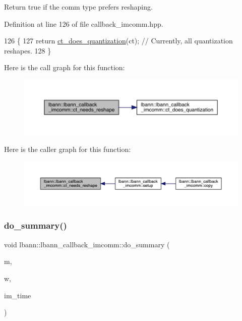 Return true if the comm type prefers reshaping. 

Definition at line 126 of file callback\+\_\+imcomm.\+hpp.


\begin{DoxyCode}
126                                                    \{
127     \textcolor{keywordflow}{return} \hyperlink{classlbann_1_1lbann__callback__imcomm_a8b29853e49c58cf737a741c503737705}{ct\_does\_quantization}(ct);  \textcolor{comment}{// Currently, all quantization reshapes.}
128   \}
\end{DoxyCode}
Here is the call graph for this function\+:\nopagebreak
\begin{figure}[H]
\begin{center}
\leavevmode
\includegraphics[width=350pt]{classlbann_1_1lbann__callback__imcomm_ab7106f5ee53672f5ef5a58371eb39f0b_cgraph}
\end{center}
\end{figure}
Here is the caller graph for this function\+:\nopagebreak
\begin{figure}[H]
\begin{center}
\leavevmode
\includegraphics[width=350pt]{classlbann_1_1lbann__callback__imcomm_ab7106f5ee53672f5ef5a58371eb39f0b_icgraph}
\end{center}
\end{figure}
\mbox{\label{classlbann_1_1lbann__callback__imcomm_ad45c39a7a85fb8e1d99eca97aa4d9d09}} 
\subsubsection{\texorpdfstring{do\+\_\+summary()}{do\_summary()}}
{\footnotesize\ttfamily void lbann\+::lbann\+\_\+callback\+\_\+imcomm\+::do\+\_\+summary (\begin{DoxyParamCaption}\item[{\hyperlink{classlbann_1_1model}{model} $\ast$}]{m,  }\item[{\hyperlink{classlbann_1_1weights}{weights} $\ast$}]{w,  }\item[{\hyperlink{base_8hpp_a3266f5ac18504bbadea983c109566867}{Eval\+Type}}]{im\+\_\+time }\end{DoxyParamCaption})\hspace{0.3cm}{\ttfamily [private]}}

